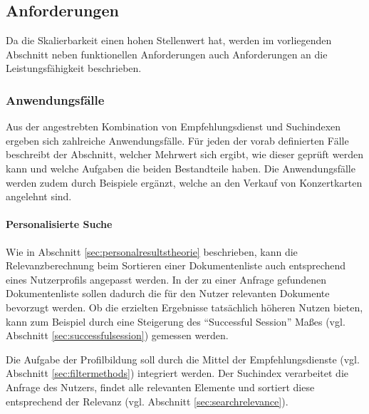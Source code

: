 \subsection{Anforderungen}\label{sec:requirements}

Da die Skalierbarkeit einen hohen Stellenwert hat, werden im vorliegenden Abschnitt neben funktionellen Anforderungen auch Anforderungen an die Leistungsfähigkeit beschrieben.


\subsubsection{Anwendungsfälle}\label{sec:userstories}

Aus der angestrebten Kombination von Empfehlungsdienst und Suchindexen ergeben sich zahlreiche Anwendungsfälle. Für jeden der vorab definierten Fälle beschreibt der Abschnitt, welcher Mehrwert sich ergibt, wie dieser geprüft werden kann und welche Aufgaben die beiden Bestandteile haben. Die Anwendungsfälle werden zudem durch Beispiele ergänzt, welche an den Verkauf von Konzertkarten angelehnt sind.%

\paragraph{Personalisierte Suche} Wie in Abschnitt \ref{sec:personalresultstheorie} beschrieben, kann die Relevanzberechnung beim Sortieren einer Dokumentenliste auch entsprechend eines Nutzerprofils angepasst werden. In der zu einer Anfrage gefundenen Dokumentenliste sollen dadurch die für den Nutzer relevanten Dokumente bevorzugt werden. Ob die erzielten Ergebnisse tatsächlich höheren Nutzen bieten, kann zum Beispiel durch eine Steigerung des ``Successful Session'' Maßes (vgl. Abschnitt \ref{sec:successfulsession}) gemessen werden.

Die Aufgabe der Profilbildung soll durch die Mittel der Empfehlungsdienste (vgl. Abschnitt \ref{sec:filtermethods}) integriert werden. Der Suchindex verarbeitet die Anfrage des Nutzers, findet alle relevanten Elemente und sortiert diese entsprechend der Relevanz (vgl. Abschnitt \ref{sec:searchrelevance}).

